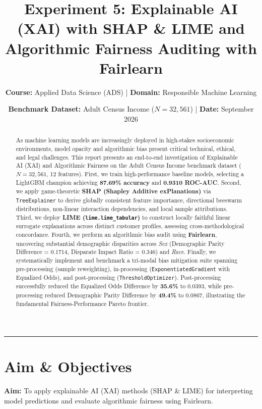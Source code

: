 \documentclass[11pt, a4paper]{article}
\title{\textbf{Experiment 5: Explainable AI (XAI) with SHAP \& LIME and Algorithmic Fairness Auditing with Fairlearn}}
\author{\textbf{Course:} Applied Data Science (ADS) \quad | \quad \textbf{Domain:} Responsible Machine Learning}
\date{\textbf{Benchmark Dataset:} Adult Census Income ($N=32,561$) \quad | \quad \textbf{Date:} September 2026}
\begin{document}
\maketitle

\begin{abstract}
As machine learning models are increasingly deployed in high-stakes socioeconomic environments, model opacity and algorithmic bias present critical technical, ethical, and legal challenges. This report presents an end-to-end investigation of Explainable AI (XAI) and Algorithmic Fairness on the Adult Census Income benchmark dataset ($N=32,561$, 12 features). First, we train high-performance baseline models, selecting a LightGBM champion achieving \textbf{87.69\% accuracy} and \textbf{0.9310 ROC-AUC}. Second, we apply game-theoretic \textbf{SHAP (Shapley Additive exPlanations)} via \texttt{TreeExplainer} to derive globally consistent feature importance, directional beeswarm distributions, non-linear interaction dependencies, and local sample attributions. Third, we deploy \textbf{LIME (\texttt{lime.lime\_tabular})} to construct locally faithful linear surrogate explanations across distinct customer profiles, assessing cross-methodological concordance. Fourth, we perform an algorithmic bias audit using \textbf{Fairlearn}, uncovering substantial demographic disparities across \textit{Sex} (Demographic Parity Difference = 0.1714, Disparate Impact Ratio = 0.346) and \textit{Race}. Finally, we systematically implement and benchmark a tri-modal bias mitigation suite spanning pre-processing (sample reweighting), in-processing (\texttt{ExponentiatedGradient} with Equalized Odds), and post-processing (\texttt{ThresholdOptimizer}). Post-processing successfully reduced the Equalized Odds Difference by \textbf{35.6\%} to 0.0393, while pre-processing reduced Demographic Parity Difference by \textbf{49.4\%} to 0.0867, illustrating the fundamental Fairness-Performance Pareto frontier.
\end{abstract}

\vspace{0.5em}
\hrule
\vspace{1em}

\section{Aim \& Objectives}
\textbf{Aim:} To apply explainable AI (XAI) methods (SHAP \& LIME) for interpreting model predictions and evaluate algorithmic fairness using Fairlearn.
\end{document}
